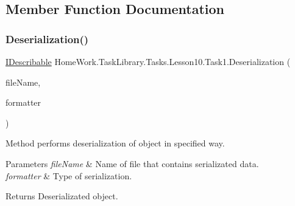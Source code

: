 \subsection{Member Function Documentation}
\mbox{\label{class_home_work_1_1_task_library_1_1_tasks_1_1_lesson10_1_1_task1_af627fdb267ed4ffa10577e8f97599ace}} 
\subsubsection{\texorpdfstring{Deserialization()}{Deserialization()}}
{\footnotesize\ttfamily \mbox{\hyperlink{interface_home_work_1_1_task_library_1_1_tasks_1_1_lesson10_1_1_interfaces_1_1_i_describable}{I\+Describable}} Home\+Work.\+Task\+Library.\+Tasks.\+Lesson10.\+Task1.\+Deserialization (\begin{DoxyParamCaption}\item[{string}]{file\+Name,  }\item[{\mbox{\hyperlink{interface_home_work_1_1_task_library_1_1_tasks_1_1_lesson10_1_1_interfaces_1_1_i_serialization}{I\+Serialization}}$<$ \mbox{\hyperlink{interface_home_work_1_1_task_library_1_1_tasks_1_1_lesson10_1_1_interfaces_1_1_i_describable}{I\+Describable}} $>$}]{formatter }\end{DoxyParamCaption})\hspace{0.3cm}{\ttfamily [private]}}



Method performs deserialization of object in specified way. 


\begin{DoxyParams}{Parameters}
{\em file\+Name} & Name of file that contains serializated data.\\
\hline
{\em formatter} & Type of serialization.\\
\hline
\end{DoxyParams}
\begin{DoxyReturn}{Returns}
Deserializated object.
\end{DoxyReturn}
\mbox{\label{class_home_work_1_1_task_library_1_1_tasks_1_1_lesson10_1_1_task1_aa214b4e6e7786da8866595b753581ad5}} 
